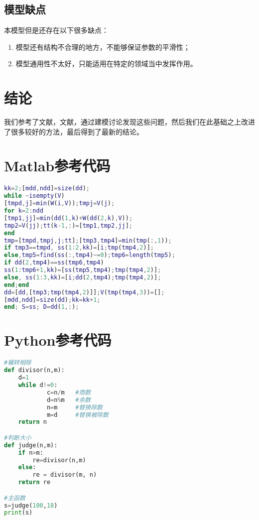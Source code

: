 \documentclass{suesmmthesis}
\begin{document}
    \subsection{模型缺点}
    本模型但是还存在以下很多缺点：
    \begin{enumerate}[label=\arabic*)]
        \item 模型还有结构不合理的地方，不能够保证参数的平滑性；
        \item 模型通用性不太好，只能适用在特定的领域当中发挥作用。
    \end{enumerate}
    \section{结论}
    我们参考了文献\cite{LiuChangping2011}，文献\cite{ChenKai2014}，通过建模讨论发现这些问题，然后我们在此基础之上改进了很多较好的方法，最后得到了最新的结论。
    \newpage
    
    \nocite{*}
    
    \newpage
    \appendix
    \section{Matlab参考代码}
\begin{lstlisting}[language=matlab,caption={The matlab Source code of Algorithm}]
kk=2;[mdd,ndd]=size(dd);
while ~isempty(V)
[tmpd,j]=min(W(i,V));tmpj=V(j);
for k=2:ndd
[tmp1,jj]=min(dd(1,k)+W(dd(2,k),V));
tmp2=V(jj);tt(k-1,:)=[tmp1,tmp2,jj];
end
tmp=[tmpd,tmpj,j;tt];[tmp3,tmp4]=min(tmp(:,1));
if tmp3==tmpd, ss(1:2,kk)=[i;tmp(tmp4,2)];
else,tmp5=find(ss(:,tmp4)~=0);tmp6=length(tmp5);
if dd(2,tmp4)==ss(tmp6,tmp4)
ss(1:tmp6+1,kk)=[ss(tmp5,tmp4);tmp(tmp4,2)];
else, ss(1:3,kk)=[i;dd(2,tmp4);tmp(tmp4,2)];
end;end
dd=[dd,[tmp3;tmp(tmp4,2)]];V(tmp(tmp4,3))=[];
[mdd,ndd]=size(dd);kk=kk+1;
end; S=ss; D=dd(1,:);
\end{lstlisting}
    \section{Python参考代码}
\begin{lstlisting}[language=python,caption={The python Source code of Algorithm}]
#辗转相除
def divisor(n,m):
    d=1
    while d!=0:
            c=n/m   #商数
            d=n%m   #余数
            n=m     #替换除数
            m=d     #替换被除数
    return n

#判断大小
def judge(n,m):
    if n>m:
        re=divisor(n,m)
    else:
        re = divisor(m, n)
    return re

#主函数
s=judge(100,18)
print(s)
\end{lstlisting}
\end{document}
